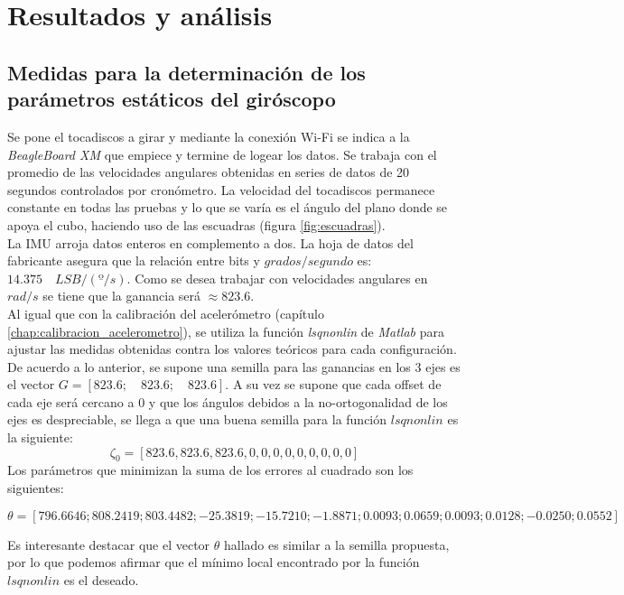 \documentclass[main]{subfiles}
\begin{document}
\section{Resultados y análisis}
\subsection{Medidas para la determinaci\'on de los par\'ametros est\'aticos del giróscopo}
Se pone el tocadiscos a girar y mediante la conexión Wi-Fi se indica a la \emph{BeagleBoard XM} que empiece y termine de logear los datos. Se trabaja con el promedio de las velocidades angulares obtenidas en series de datos de 20 segundos controlados por cronómetro. La velocidad del tocadiscos permanece constante en todas las pruebas y lo que se varía es el ángulo del plano donde se apoya el cubo, haciendo uso de las escuadras (figura \ref{fig:escuadras}).\\

La IMU arroja datos enteros en complemento a dos. La hoja de datos del fabricante asegura que la relaci\'on entre bits y $grados/segundo$ es: $14.375\quad LSB/(º/s)$. Como se desea trabajar con velocidades angulares en $rad/s$ se tiene que la ganancia ser\'a $\approx 823.6$.\\

Al igual que con la calibración del acelerómetro (capítulo \ref{chap:calibracion_acelerometro}), se utiliza la función \emph{lsqnonlin} de \emph{Matlab} para ajustar las medidas obtenidas contra los valores teóricos para cada configuración. De acuerdo a lo anterior, se supone una semilla para las ganancias en los 3 ejes es el vector $G=[823.6;\quad 823.6;\quad 823.6]$. A su vez se supone que cada offset de cada eje será cercano a 0 y que los ángulos debidos a la no-ortogonalidad de los ejes es despreciable, se llega a que una buena semilla para la función $lsqnonlin$ es la siguiente:
$$\zeta _0=\left[823.6,823.6,823.6,0,0,0,0,0,0,0,0,0\right]$$
Los parámetros que minimizan la suma de los errores al cuadrado son los siguientes:
\begin{scriptsize}
\begin{equation}
\theta=\left[
 796.6646 ; 808.2419 ; 803.4482 ; -25.3819 ; -15.7210 ; -1.8871; 0.0093 ; 0.0659 ; 0.0093 ; 0.0128 ; -0.0250 ; 0.0552  \right]
\end{equation}
\end{scriptsize}
Es interesante destacar que el vector $\theta$ hallado es similar a la semilla propuesta, por lo que podemos afirmar que el mínimo local encontrado por la función $lsqnonlin$ es el deseado.\\
\end{document}
